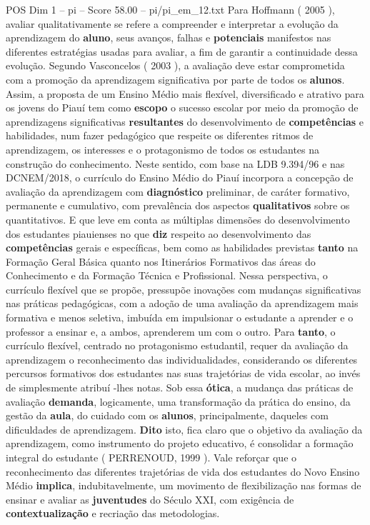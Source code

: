 \begin{textsample}{POS Dim 1 – pi – Score 58.00 – pi/pi\_em\_12.txt}
Para Hoffmann ( 2005 ), avaliar qualitativamente se refere a compreender e interpretar a evolução da aprendizagem do \textbf{aluno}, seus avanços, falhas e \textbf{potenciais} manifestos nas diferentes estratégias usadas para avaliar, a fim de garantir a continuidade dessa evolução.
Segundo Vasconcelos ( 2003 ), a avaliação deve estar comprometida com a promoção da aprendizagem significativa por parte de todos os \textbf{alunos}.
Assim, a proposta de um Ensino Médio mais flexível, diversificado e atrativo para os jovens do Piauí tem como \textbf{escopo} o sucesso escolar por meio da promoção de aprendizagens significativas \textbf{resultantes} do desenvolvimento de \textbf{competências} e habilidades, num fazer pedagógico que respeite os diferentes ritmos de aprendizagem, os interesses e o protagonismo de todos os estudantes na construção do conhecimento.
Neste sentido, com base na LDB 9.394/96 e nas DCNEM/2018, o currículo do Ensino Médio do Piauí incorpora a concepção de avaliação da aprendizagem com \textbf{diagnóstico} preliminar, de caráter formativo, permanente e cumulativo, com prevalência dos aspectos \textbf{qualitativos} sobre os quantitativos.
E que leve em conta as múltiplas dimensões do desenvolvimento dos estudantes piauienses no que \textbf{diz} respeito ao desenvolvimento das \textbf{competências} gerais e específicas, bem como as habilidades previstas \textbf{tanto} na Formação Geral Básica quanto nos Itinerários Formativos das áreas do Conhecimento e da Formação Técnica e Profissional.
Nessa perspectiva, o currículo flexível que se propõe, pressupõe inovações com mudanças significativas nas práticas pedagógicas, com a adoção de uma avaliação da aprendizagem mais formativa e menos seletiva, imbuída em impulsionar o estudante a aprender e o professor a ensinar e, a ambos, aprenderem um com o outro.
Para \textbf{tanto}, o currículo flexível, centrado no protagonismo estudantil, requer da avaliação da aprendizagem o reconhecimento das individualidades, considerando os diferentes percursos formativos dos estudantes nas suas trajetórias de vida escolar, ao invés de simplesmente atribuí -lhes notas.
Sob essa \textbf{ótica}, a mudança das práticas de avaliação \textbf{demanda}, logicamente, uma transformação da prática do ensino, da gestão da \textbf{aula}, do cuidado com os \textbf{alunos}, principalmente, daqueles com dificuldades de aprendizagem. \textbf{Dito} isto, fica claro que o objetivo da avaliação da aprendizagem, como instrumento do projeto educativo, é consolidar a formação integral do estudante ( PERRENOUD, 1999 ).
Vale reforçar que o reconhecimento das diferentes trajetórias de vida dos estudantes do Novo Ensino Médio \textbf{implica}, indubitavelmente, um movimento de flexibilização nas formas de ensinar e avaliar as \textbf{juventudes} do Século XXI, com exigência de \textbf{contextualização} e recriação das metodologias.

\end{textsample}
